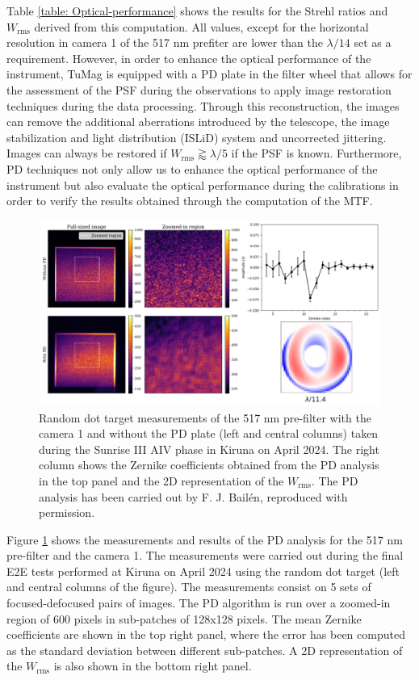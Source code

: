 Table \ref{table: Optical-performance} shows the results for the Strehl ratios and $W_{\text{rms}}$ derived from this computation. All values, except for the horizontal resolution in camera 1 of the 517 nm prefiter are lower than the $\lambda/14$ set as a requirement. However, in order to enhance the optical performance of the instrument, TuMag is equipped with a PD plate in the filter wheel that allows for the assessment of the PSF during the observations to apply image restoration techniques during the data processing. Through this reconstruction, the images can remove the additional aberrations introduced by the telescope, the image stabilization and light distribution (ISLiD) system and uncorrected jittering. Images can always be restored if $W_{\text{rms}} \gtrapprox \lambda / 5$ \citep{vargas_tesis} if the PSF is known. Furthermore, PD techniques not only allow us to enhance the optical performance of the instrument but also evaluate the optical performance during the calibrations in order to verify the results obtained through the computation of the MTF. 

\begin{figure}[t]
    \includegraphics[width=\textwidth]{figures/TuMag/PD_e2e.pdf}
    \caption[E2E PD analysis of TuMag's optical performance.]{Random dot target measurements of the 517 nm pre-filter with the camera 1 and without the PD plate (left and central columns) taken during the Sunrise III AIV phase in Kiruna on April 2024. The right column shows the Zernike coefficients obtained from the PD analysis in the top panel and the 2D representation of the $W_{\text{rms}}$. The PD analysis has been carried out by F. J. Bailén, reproduced with permission.}
      \label{tumag : PD}
\end{figure}

Figure \ref{tumag : PD} shows the measurements and results of the PD analysis for the 517 nm pre-filter and the camera 1. The measurements were carried out during the final E2E tests performed at Kiruna on April 2024 using the random dot target (left and central columns of the figure). The measurements consist on 5 sets of focused-defocused pairs of images. The PD algorithm is run over a zoomed-in region of 600 pixels in sub-patches of 128x128 pixels. The mean Zernike coefficients are shown in the top right panel, where the error has been computed as the standard deviation between different sub-patches. A 2D representation of the $W_{\text{rms}}$ is also shown in the bottom right panel. 

